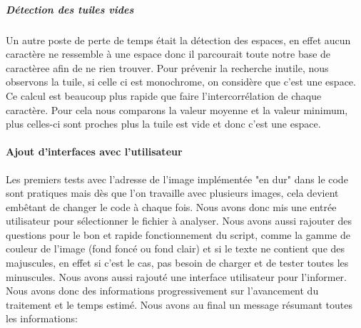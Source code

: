 \documentclass[a4paper,12pt,titlepage]{report}
\begin{document}
\subparagraph{Détection des tuiles vides}
Un autre poste de perte de temps était la détection des espaces, en effet aucun caractère ne ressemble à une espace donc il parcourait toute notre base de caractèree afin de ne rien trouver. Pour prévenir la recherche inutile, nous observons la tuile, si celle ci est monochrome, on considère que c'est une espace. Ce calcul est beaucoup plus rapide que faire l'intercorrélation de chaque caractère. Pour cela nous comparons la valeur moyenne et la valeur minimum, plus celles-ci sont proches plus la tuile est vide et donc c'est une espace.

\paragraph{Ajout d'interfaces avec l'utilisateur}
	Les premiers tests avec l'adresse de l'image implémentée "en dur" dans le code sont pratiques mais dès que l'on travaille avec plusieurs images, cela devient embêtant de changer le code à chaque fois. Nous avons donc mis une entrée utilisateur pour sélectionner le fichier à analyser.
	Nous avons aussi rajouter des questions pour le bon et rapide fonctionnement du script, comme la gamme de couleur de l'image (fond foncé ou fond clair) et si le texte ne contient que des majuscules, en effet si c'est le cas, pas besoin de charger et de tester toutes les minuscules.
	Nous avons aussi rajouté une interface utilisateur pour l'informer. Nous avons donc des informations progressivement sur l'avancement du traitement et le temps estimé. Nous avons au final un message résumant toutes les informations:\\
\end{document}
